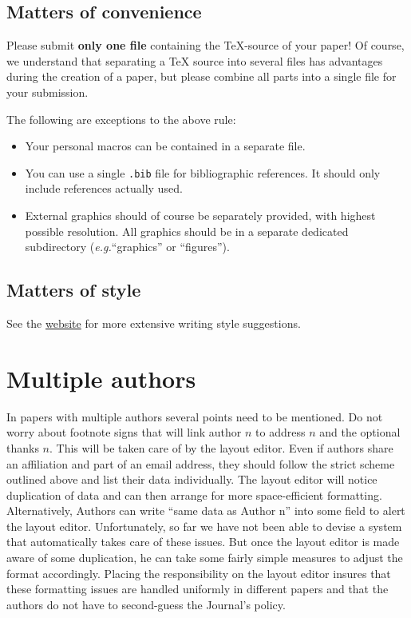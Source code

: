 \documentclass{jpc} %
\theoremstyle{plain}\newtheorem{satz}[thm]{Satz} %
\def\eg{{\em e.g.}}
\begin{document}
\subsection*{Matters of convenience}

  Please submit {\bf only one file} containing the
  TeX-source of your paper!   Of course,
  we understand that separating a TeX source into several files has
  advantages during the creation of a paper, but please combine all
  parts into a single file for your submission. 
  
  The following are exceptions to the above rule:
  \begin{itemize}
  	\item Your personal macros can  be contained in a separate file.
  	\item You can use a single \texttt{.bib} file for bibliographic references. It should only include references actually used.
  	\item External
  graphics should of course be separately provided, with highest possible resolution. All graphics should be in a separate dedicated subdirectory (\eg ``graphics'' or ``figures'').
\end{itemize}

\subsection*{Matters of style}

  See the \href{https://journalprivacyconfidentiality.org/index.php/jpc/about/submissions}{website} for more extensive writing style suggestions.

\section{Multiple authors}

  In papers with multiple authors several points need to be mentioned.
  Do not worry about footnote signs that will link author $n$ to
  address $n$ and the optional thanks $n$.  This will be taken care of
  by the layout editor.  Even if authors share an affiliation and part
  of an email address, they should follow the strict scheme outlined
  above and list their data individually.  The layout editor will
  notice duplication of data and can then arrange for more
  space-efficient formatting.  Alternatively, Authors can write ``same
  data as Author n'' into some field to alert the layout editor.
  Unfortunately, so far we have not been able to devise a system that
  automatically takes care of these issues.  But once the layout
  editor is made aware of some duplication, he can take some fairly
  simple measures to adjust the format accordingly.  Placing the
  responsibility on the layout editor insures that these formatting
  issues are handled uniformly in different papers and that the
  authors do not have to second-guess the Journal's policy.
\end{document}
